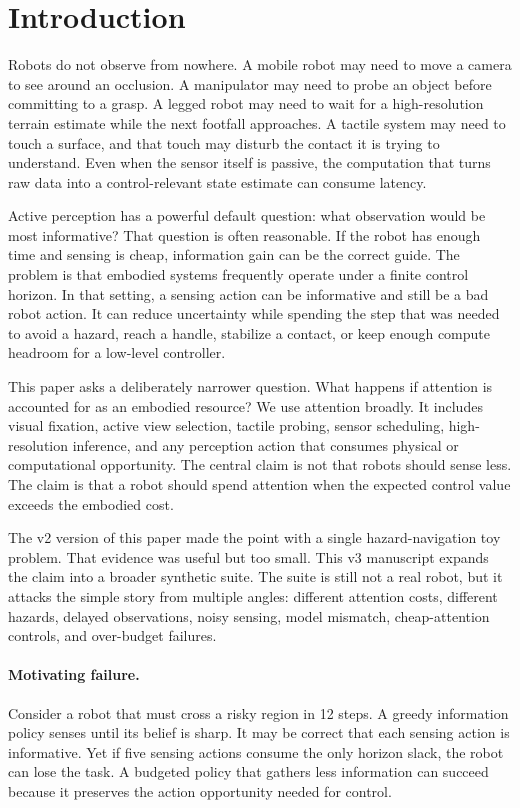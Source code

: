 \documentclass{article}
\begin{document}
\section{Introduction}

Robots do not observe from nowhere. A mobile robot may need to move a camera to
see around an occlusion. A manipulator may need to probe an object before
committing to a grasp. A legged robot may need to wait for a high-resolution
terrain estimate while the next footfall approaches. A tactile system may need
to touch a surface, and that touch may disturb the contact it is trying to
understand. Even when the sensor itself is passive, the computation that turns
raw data into a control-relevant state estimate can consume latency.

Active perception has a powerful default question: what observation would be
most informative? That question is often reasonable. If the robot has enough
time and sensing is cheap, information gain can be the correct guide. The
problem is that embodied systems frequently operate under a finite control
horizon. In that setting, a sensing action can be informative and still be a bad
robot action. It can reduce uncertainty while spending the step that was needed
to avoid a hazard, reach a handle, stabilize a contact, or keep enough compute
headroom for a low-level controller.

This paper asks a deliberately narrower question. What happens if attention is
accounted for as an embodied resource? We use attention broadly. It includes
visual fixation, active view selection, tactile probing, sensor scheduling,
high-resolution inference, and any perception action that consumes physical or
computational opportunity. The central claim is not that robots should sense
less. The claim is that a robot should spend attention when the expected
control value exceeds the embodied cost.

The v2 version of this paper made the point with a single hazard-navigation
toy problem. That evidence was useful but too small. This v3 manuscript expands
the claim into a broader synthetic suite. The suite is still not a real robot,
but it attacks the simple story from multiple angles: different attention
costs, different hazards, delayed observations, noisy sensing, model mismatch,
cheap-attention controls, and over-budget failures.

\paragraph{Motivating failure.}
Consider a robot that must cross a risky region in 12 steps. A greedy
information policy senses until its belief is sharp. It may be correct that
each sensing action is informative. Yet if five sensing actions consume the
only horizon slack, the robot can lose the task. A budgeted policy that gathers
less information can succeed because it preserves the action opportunity needed
for control.
\end{document}
